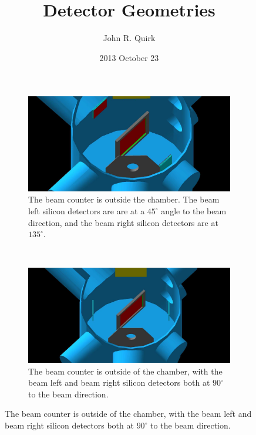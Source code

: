 \documentclass[a4paper]{article}
\title{Detector Geometries}
\author{John R. Quirk}
\date{2013 October 23}
\begin{document}
\maketitle

\begin{figure}
  \centering
  \begin{subfigure}[t]{0.45\textwidth}
    \includegraphics[scale=0.15]{chamber_orientations_pics/chamber_45135_BCout}
    \caption{The beam counter is outside the chamber. The beam left silicon detectors
    are are at a $45^{\circ}$ angle to the beam direction, and the beam right
    silicon detectors are at $135^{\circ}$.}
    \label{fig:chamb_45135_bcout}
  \end{subfigure}
  ~
  \begin{subfigure}[t]{0.45\textwidth}
    \includegraphics[scale=0.15]{chamber_orientations_pics/chamber_9090_BCout}
    \caption{The beam counter is outside of the chamber, with the beam left and beam
    right silicon detectors both at $90^{\circ}$ to the beam direction.}
    \label{fig:chamb_9090_bcout}
  \end{subfigure}


\end{figure}
\end{document}
